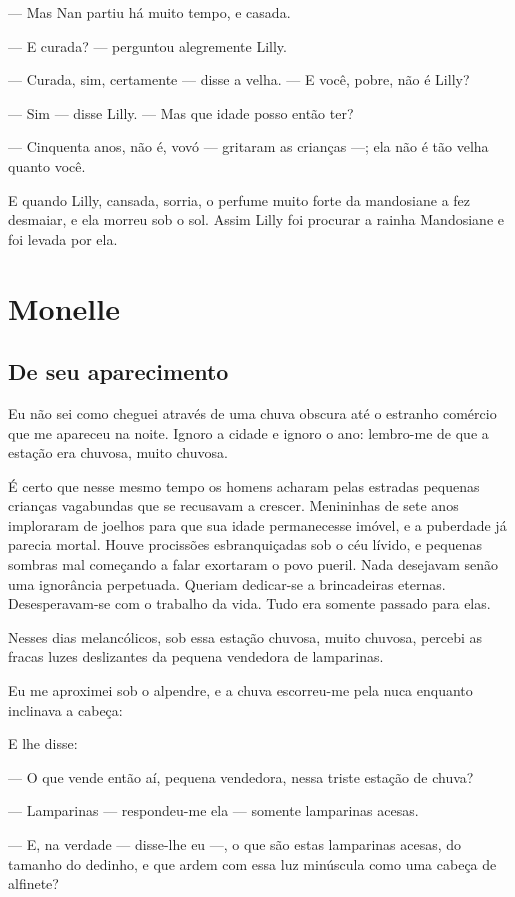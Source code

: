 --- Mas Nan partiu há muito tempo, e casada.

--- E curada? --- perguntou alegremente Lilly.

--- Curada, sim, certamente --- disse a velha. --- E você, pobre, não é Lilly?

--- Sim --- disse Lilly. --- Mas que idade posso então ter?

--- Cinquenta anos, não é, vovó --- gritaram as crianças ---; ela não é tão
velha quanto você.

E quando Lilly, cansada, sorria, o perfume muito forte da mandosiane a
fez desmaiar, e ela morreu sob o sol. Assim Lilly foi procurar a rainha
Mandosiane e foi levada por ela.

\chapter{Monelle}

\section{De seu aparecimento}

Eu não sei como cheguei através de uma chuva obscura até o estranho
comércio que me apareceu na noite. Ignoro a cidade e ignoro o ano:
lembro-me de que a estação era chuvosa, muito chuvosa.

É certo que nesse mesmo tempo os homens acharam pelas estradas pequenas
crianças vagabundas que se recusavam a crescer. Menininhas de sete anos
imploraram de joelhos para que sua idade permanecesse imóvel, e a
puberdade já parecia mortal. Houve procissões esbranquiçadas sob o céu
lívido, e pequenas sombras mal começando a falar exortaram o povo pueril.
Nada desejavam senão uma ignorância perpetuada. Queriam dedicar-se a
brincadeiras eternas. Desesperavam-se com o trabalho da vida. Tudo era
somente passado para elas.

Nesses dias melancólicos, sob essa estação chuvosa, muito chuvosa,
percebi as fracas luzes deslizantes da pequena vendedora de lamparinas.

Eu me aproximei sob o alpendre, e a chuva escorreu-me pela nuca
enquanto inclinava a cabeça:

E lhe disse:

--- O que vende então aí, pequena vendedora, nessa triste estação de
chuva?

--- Lamparinas --- respondeu-me ela --- somente lamparinas acesas.

--- E, na verdade --- disse-lhe eu ---, o que são estas lamparinas acesas, do
tamanho do dedinho, e que ardem com essa luz minúscula como uma cabeça de
alfinete?

